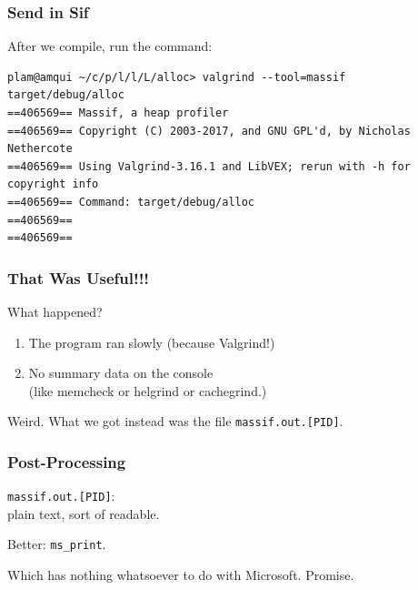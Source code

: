 \begin{frame}[fragile]
\frametitle{Send in Sif}

After we compile, run the command:
{\scriptsize
\begin{verbatim}
plam@amqui ~/c/p/l/l/L/alloc> valgrind --tool=massif target/debug/alloc
==406569== Massif, a heap profiler
==406569== Copyright (C) 2003-2017, and GNU GPL'd, by Nicholas Nethercote
==406569== Using Valgrind-3.16.1 and LibVEX; rerun with -h for copyright info
==406569== Command: target/debug/alloc
==406569== 
==406569== 
\end{verbatim}
}
\end{frame}


\begin{frame}
\frametitle{That Was Useful!!!}

\large

What happened? 

\begin{enumerate}
\item The program ran slowly (because Valgrind!)

\item No summary data on the console \\
\hspace*{2em} (like memcheck or helgrind or cachegrind.)
\end{enumerate}

Weird. What we got instead was the file \texttt{massif.out.[PID]}.


\end{frame}


\begin{frame}
\frametitle{Post-Processing}

\Large

\texttt{massif.out.[PID]}:\\
\hspace*{2cm} plain text, sort of readable.

Better: \texttt{ms\_print}.

Which has nothing whatsoever to do with Microsoft. Promise.


\end{frame}


